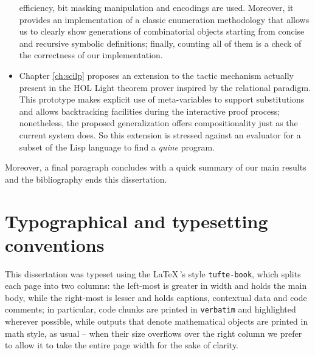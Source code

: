 \begin{itemize}
efficiency, bit masking manipulation and encodings are used. Moreover, it
provides an implementation of a classic enumeration methodology that allows us
to clearly show generations of combinatorial objects starting from concise and
recursive symbolic definitions; finally, counting all of them is a check of
the correctness of our implementation.
\item Chapter \ref{ch:scilp} proposes an extension to the tactic mechanism
actually present in the HOL Light theorem prover inspired by the relational
paradigm. This prototype makes explicit use of meta-variables to support
substitutions and allows backtracking facilities during the interactive proof
process; nonetheless, the proposed generalization offers compositionality just
as the current system does. So this extension is stressed against an evaluator
for a subset of the Lisp language to find a \textit{quine} program.
\end{itemize}

Moreover, a final paragraph concludes with a quick summary of our main results
and the bibliography ends this dissertation.

\section*{Typographical and typesetting conventions}

This dissertation was typeset using the \LaTeX\,'s style \verb|tufte-book|,
which splits each page into two columns: the left-most is greater in width and
holds the main body, while the right-most is lesser and holds captions,
contextual data and code comments; in particular, code chunks are printed in
\verb|verbatim| and highlighted wherever possible, while outputs that denote
mathematical objects are printed in math style, as usual -- when their size
overflows over the right column we prefer to allow it to take the entire
page width for the sake of clarity.




